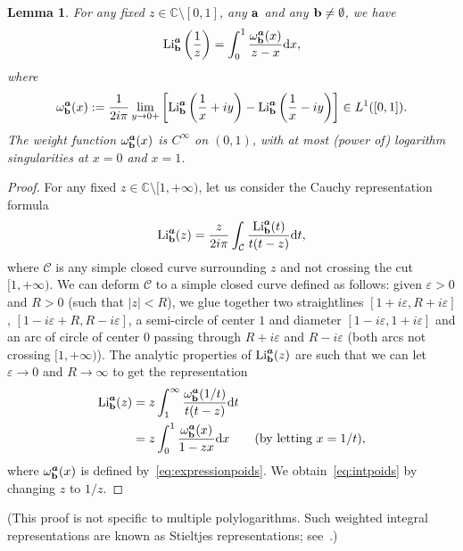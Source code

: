 \documentclass[reqno,12pt]{amsart}
\numberwithin{equation}{section}
\newtheorem{lem}{Lemma}
\theoremstyle{remark}
\def\om{\omega}
\def\li{\operatorname{Li}}
\def\dd{\textup{d}}
\begin{document}
\begin{lem}\label{lem:weight} For any fixed $z\in \mathbb C\setminus [0,1]$, 
any ${\bf a}$ and any ${\bf b}\neq \emptyset$, we have
\begin{equation}\label{eq:intpoids}
\li_{{\bf b}}^{\boldsymbol{a}}\left(\frac1z\right) = \int_0^1 
\frac{\om_{{\bf b}}^{\boldsymbol{a}}(x)}{z-x} \dd x,
\end{equation}
where 
\begin{equation}\label{eq:expressionpoids}
\om_{{\bf b}}^{\boldsymbol{a}}(x) :=\frac1{2i \pi}\lim_{y\to 0+}
\left[\li_{{\bf b}}^{\boldsymbol{a}}\left(\frac{1}{x}+iy\right)- 
\li_{{\bf b}}^{\boldsymbol{a}}\left(\frac{1}{x}-iy\right)\right] \in L^1([0,1]).
\end{equation}
The {\em weight function}  $\om_{{\bf b}}^{\boldsymbol{a}}(x)$ is $C^\infty$ on $(0,1)$, with at most (power of) logarithm 
singularities at $x=0$ and $x=1$.
\end{lem}
\begin{proof}
For any fixed $z\in \mathbb C\setminus [1,+\infty)$, let us consider
the Cauchy representation formula 
$$
\li_{{\bf b}}^{\boldsymbol{a}}(z) = \frac z{2i\pi}\int_{\mathcal{C}} 
\frac{\li_{{\bf b}}^{\boldsymbol{a}}(t)}{t(t-z)} \dd t,
$$
where $\mathcal{C}$ is any simple closed curve surrounding $z$ and not crossing the cut $[1,+\infty)$. We can deform 
$\mathcal{C}$ to a simple closed curve defined as follows: 
given $\varepsilon>0$ and $R>0$ (such that $\vert z\vert <R$), we glue together
two straightlines $[1+i\varepsilon,R+i\varepsilon]$, 
$[1-i\varepsilon+R,R-i\varepsilon]$, a semi-circle of center $1$ and diameter $[1-i\varepsilon, 1+i\varepsilon]$ and an arc 
of circle of center $0$ passing through $R+i\varepsilon$ and $R-i\varepsilon$ 
(both arcs not crossing $[1,+\infty)$). The analytic 
properties of $\li_{{\bf b}}^{\boldsymbol{a}}(z)$ are such that we can let $\varepsilon\to 0$ and $R\to \infty$ 
to get the representation
\begin{align*}
\li_{{\bf b}}^{\boldsymbol{a}}(z) 
& = z\int_1^{\infty} \frac{\om_{{\bf b}}^{\boldsymbol{a}}(1/t)}{t(t-z)} \dd t\\
& = z\int_0^{1} \frac{\om_{{\bf b}}^{\boldsymbol{a}}(x)}{1-zx} \dd x\qquad (\mbox{by letting }x=1/t),
\end{align*}
where $\om_{{\bf b}}^{\boldsymbol{a}}(x)$ is defined by~\eqref{eq:expressionpoids}. 
We obtain~\eqref{eq:intpoids} by changing $z$  to $1/z$.
\end{proof}
(This proof is not specific to multiple polylogarithms. Such weighted integral representations 
are known as Stieltjes representations; see~\cite[p. 591, Theorem 12.10d]{Henrici}.)
\end{document}
